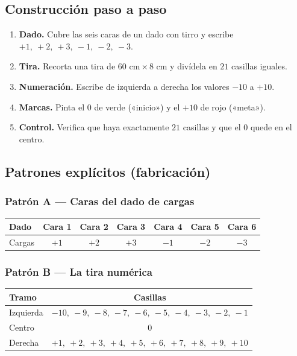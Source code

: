 \documentclass[12pt, letterpaper]{article}
\begin{document}
\subsection{Construcción paso a paso}

\begin{enumerate}[leftmargin=*]
  \item \textbf{Dado.} Cubre las seis caras de un dado con tirro y escribe $+1,\ +2,\ +3,\ -1,\ -2,\ -3$.
  \item \textbf{Tira.} Recorta una tira de $60\text{ cm}\times 8\text{ cm}$ y divídela en $21$ casillas iguales.
  \item \textbf{Numeración.} Escribe de izquierda a derecha los valores $-10$ a $+10$.
  \item \textbf{Marcas.} Pinta el $0$ de verde («inicio») y el $+10$ de rojo («meta»).
  \item \textbf{Control.} Verifica que haya exactamente $21$ casillas y que el $0$ quede en el centro.
\end{enumerate}

\subsection{Patrones explícitos (fabricación)}

\subsubsection{Patrón A — Caras del dado de cargas}

\begin{center}
\small
\begin{tabular}{@{}l c c c c c c@{}}
\toprule
\textbf{Dado} & \textbf{Cara 1} & \textbf{Cara 2} & \textbf{Cara 3} & \textbf{Cara 4} & \textbf{Cara 5} & \textbf{Cara 6}\\
\midrule
Cargas & $+1$ & $+2$ & $+3$ & $-1$ & $-2$ & $-3$\\
\bottomrule
\end{tabular}
\end{center}

\subsubsection{Patrón B — La tira numérica}

\begin{center}
\small
\begin{tabular}{@{}l c@{}}
\toprule
\textbf{Tramo} & \textbf{Casillas}\\
\midrule
Izquierda & $-10,\ -9,\ -8,\ -7,\ -6,\ -5,\ -4,\ -3,\ -2,\ -1$\\
Centro & $0$\\
Derecha & $+1,\ +2,\ +3,\ +4,\ +5,\ +6,\ +7,\ +8,\ +9,\ +10$\\
\bottomrule
\end{tabular}
\end{center}
\end{document}
